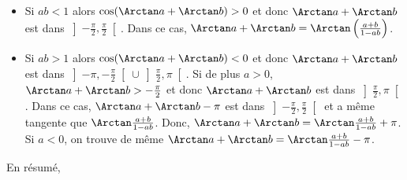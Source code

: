{\begin{enumerate}
{\begin{itemize}
\item[\textbf{1er cas.}] Si $ab<1$ alors $\cos(\Arctan a+\Arctan
b)>0$ et donc $\Arctan a+\Arctan b$ est dans $\left]-\frac{\pi}{2},\frac{\pi}{2}\right[$.
Dans ce cas, $\Arctan a+\Arctan b=\Arctan\left(\frac{a+b}{1-ab}\right)$.
\item[\textbf{2ème cas.}]
Si $ab>1$ alors $\cos(\Arctan a+\Arctan b)<0$ et donc $\Arctan a+\Arctan b$ est 
dans $\left]-\pi,-\frac{\pi}{2}\right[\cup\left]\frac{\pi}{2},\pi\right[$. Si de plus $a>0$, 
$\Arctan a+\Arctan b>-\frac{\pi}{2}$ et donc $\Arctan a+\Arctan b$ est dans 
$\left]\frac{\pi}{2},\pi\right[$. Dans ce cas, $\Arctan a+\Arctan b-\pi$ est dans
$\left]-\frac{\pi}{2},\frac{\pi}{2}\right[$ et a même tangente que 
$\Arctan\frac{a+b}{1-ab}$. Donc, $\Arctan a+\Arctan 
b=\Arctan\frac{a+b}{1-ab}+\pi$. Si $a<0$, on trouve de même $\Arctan a+\Arctan
b=\Arctan\frac{a+b}{1-ab}-\pi$.
\end{itemize}
En résumé,

\begin{center}
\end{center}
}
\end{enumerate}
}
